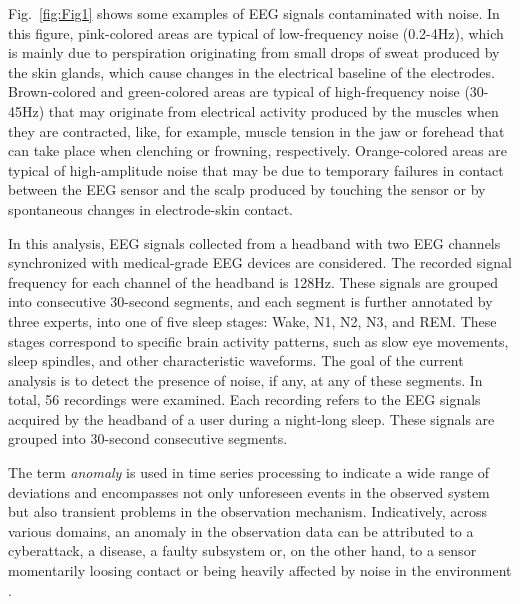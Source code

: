 \documentclass[runningheads]{llncs}
\begin{document}
Fig.~\ref{fig:Fig1} shows some examples of EEG signals contaminated
with noise. In this figure, pink-colored areas are typical of
low-frequency noise (0.2-4Hz), which is mainly due to perspiration
originating from small drops of sweat produced by the skin glands,
which cause changes in the electrical baseline of the
electrodes. Brown-colored and green-colored areas are typical of
high-frequency noise (30-45Hz) that may originate from electrical
activity produced by the muscles when they are contracted, like, for
example, muscle tension in the jaw or forehead that can take place
when clenching or frowning, respectively. Orange-colored areas are
typical of high-amplitude noise that may be due to temporary failures
in contact between the EEG sensor and the scalp produced by touching
the sensor or by spontaneous changes in electrode-skin contact.

In this analysis, EEG signals collected from a headband with two EEG channels synchronized with medical-grade EEG devices are considered. The recorded signal frequency for each channel of the headband is 128Hz. These signals are grouped into consecutive 30-second segments, and each segment is further annotated by three experts, into one of five sleep stages: Wake, N1, N2, N3, and REM. These stages correspond to specific brain activity patterns, such as slow eye movements, sleep spindles, and other characteristic waveforms. The goal of the current analysis is to detect the presence of noise, if any, at any of these segments. In total, 56 recordings were examined. Each recording refers to the EEG signals acquired by the headband of a user during a night-long sleep. These signals are grouped into 30-second consecutive segments.



The term \emph{anomaly} is used in time series processing to indicate
a wide range of deviations and encompasses not only unforeseen events
in the observed system but also transient problems in the observation
mechanism. Indicatively, across various domains, an anomaly in the
observation data can be attributed to a cyberattack, a disease, a
faulty subsystem or, on the other hand, to a sensor momentarily
loosing contact or being heavily affected by noise in the environment
\cite{laptev_generic_2015,geiger_tadgan:_2020,ji_novel_2021,zhou_anomaly_2021}.
\end{document}

